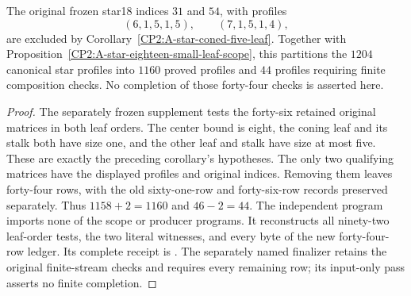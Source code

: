 \begin{proposition}
\label{CP2:A-star-eighteen-coned-five-scope}
The original frozen star18 indices $31$ and $54$, with profiles
\[
 (6,1,5,1,5),\qquad(7,1,5,1,4),
\]
are excluded by Corollary~\ref{CP2:A-star-coned-five-leaf}.
Together with Proposition~\ref{CP2:A-star-eighteen-small-leaf-scope},
this partitions the $1204$ canonical star profiles into $1160$
proved profiles and $44$ profiles requiring finite composition
checks. No completion of those forty-four checks is asserted here.
\end{proposition}
\begin{proof}
The separately frozen supplement
tests the forty-six retained original matrices in both leaf
orders. The center bound is eight, the coning leaf and its
stalk both have size one, and the other leaf and stalk have
size at most five. These are exactly the preceding corollary's
hypotheses. The only two qualifying matrices have the displayed
profiles and original indices. Removing them leaves forty-four
rows, with the old sixty-one-row and forty-six-row records
preserved separately. Thus $1158+2=1160$ and $46-2=44$.
The independent program
imports none of the scope or producer programs. It reconstructs
all ninety-two leaf-order tests, the two literal witnesses,
and every byte of the new forty-four-row ledger. Its complete
receipt is
.
The separately named finalizer
retains the original finite-stream checks and requires every
remaining row; its input-only pass asserts no finite completion.
\end{proof}
